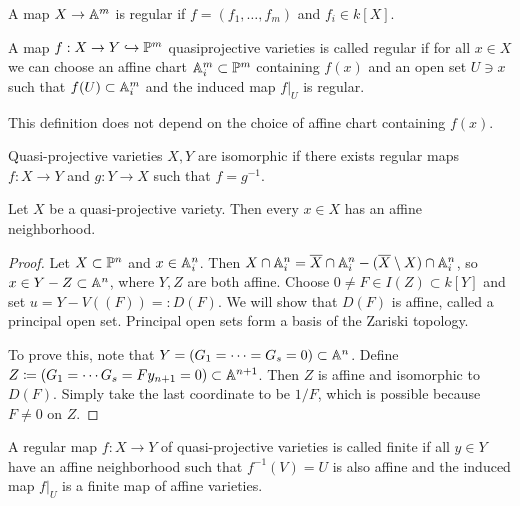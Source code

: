 \documentclass[twoside, 10pt]{article}
\begin{document}
    \begin{defn} A map $X \to \A^m$ is regular if $f = (f_1, \ldots, f_m)$ and
    $f_i \in k[X]$.  \end{defn}

    \begin{defn} A map $f: X \to Y \hookrightarrow \P^m$ quasiprojective
        varieties is called regular if for all $x \in X$ we can choose an
        affine chart $\A_i^m \subset \P^m$ containing $f(x)$ and an open set $U
        \ni x$ such that $f(U) \subset \A_i^m$ and the induced map $f\vert_U$
        is regular.  \end{defn}

    \begin{rmk} This definition does not depend on the choice of affine chart
    containing $f(x)$.  \end{rmk}

    \begin{defn} Quasi-projective varieties $X,Y$ are isomorphic if there
    exists regular maps $f:X \to Y$ and $g:Y \to X$ such that $f = g^{-1}$.
\end{defn}

    \begin{lem} Let $X$ be a quasi-projective variety. Then every $x \in X$ has
        an affine neighborhood.  \begin{proof} Let $X \subset \P^n$ and $x \in
            \A_i^n$. Then $X \cap \A_i^n = \overline{X} \cap \A_i^n -
            (\overline{X}\setminus X) \cap \A_i^n$, so $x \in Y - Z \subset
            \A^n$, where $Y,Z$ are both affine. Choose $0 \neq F \in I(Z)
            \subset k[Y]$ and set $u = Y - V((F))=: D(F)$.  We will show that
            $D(F)$ is affine, called a principal open set.  Principal open sets
            form a basis of the Zariski topology.

            To prove this, note that $Y = (G_1 = \cdots = G_s= 0) \subset
            \A^n$. Define $Z \coloneqq (G_1 = \cdots G_s = Fy_{n+1} = 0)
            \subset \A^{n+1}$. Then $Z$ is affine and isomorphic to $D(F)$.
            Simply take the last coordinate to be $1/F$, which is possible
        because $F \neq 0$ on $Z$.  \end{proof} \end{lem}

    \begin{defn} A regular map $f:X \to Y$ of quasi-projective varieties is
        called finite if all $y \in Y$ have an affine neighborhood such that
        $f^{-1}(V) = U$ is also affine and the induced map $f\vert_U$ is a
        finite map of affine varieties.  \end{defn}
\end{document}
